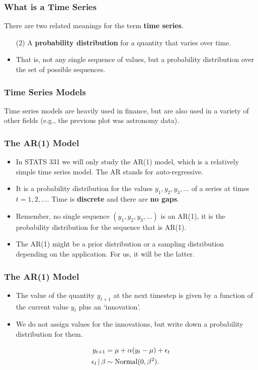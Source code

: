 \documentclass{beamer}
\newcommand{\given}{\,|\,}
\begin{document}
\begin{frame}
\frametitle{What is a Time Series}
There are two related meanings for the term {\bf time series}.

\begin{itemize}
\item [(2)] A {\bf probability distribution} for a quantity that varies over time.\pause
\item That is, not any single sequence of values,
but a probability distribution over the
set of possible sequences.
\end{itemize}

\end{frame}


\begin{frame}
\frametitle{Time Series Models}
Time series models are heavily used in finance, but are also used in a 
variety of other fields (e.g., the previous plot was astronomy data).

\end{frame}

\begin{frame}
\frametitle{The AR(1) Model}

\begin{itemize}
\item In STATS 331 we will only study the AR(1) model, which is a relatively simple
time series model. The AR stands for auto-regressive.\pause
\item It is a probability distribution for the values $y_1, y_2, y_3, ...$
of a series at times $t=1, 2, ...$.
Time is {\bf discrete} and there are {\bf no gaps}.\pause
\item Remember, no single sequence $(y_1, y_2, y_3, ...)$ is an AR(1), it is
the probability distribution for the sequence that is AR(1).\pause
\item The AR(1) might be a prior distribution or a sampling distribution
depending on the application. For us, it will be the latter.
\end{itemize}
\end{frame}

\begin{frame}
\frametitle{The AR(1) Model}

\begin{itemize}
\item The value of the quantity $y_{t+1}$ at the next timestep is given by
a function of the current value $y_{t}$ plus an `innovation'.\pause
\item We do not assign values for the innovations, but write down
a probability distribution for them.\pause
\end{itemize}
\begin{align}
y_{t+1} &= \mu + \alpha(y_t - \mu) + \epsilon_t \\
\epsilon_t \given \beta &\sim \textnormal{Normal}(0, \beta^2).
\end{align}

\end{frame}
\end{document}
